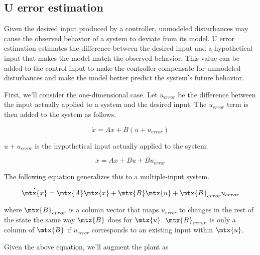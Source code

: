 \subsection{U error estimation}
\label{subsec:u_error_estimation}

Given the desired \gls{input} produced by a \gls{controller}, unmodeled
\glspl{disturbance} may cause the observed behavior of a \gls{system} to deviate
from its \gls{model}. U error estimation estimates the difference between the
desired \gls{input} and a hypothetical \gls{input} that makes the \gls{model}
match the observed behavior. This value can be added to the \gls{control input}
to make the \gls{controller} compensate for unmodeled \glspl{disturbance} and
make the \gls{model} better predict the \gls{system}'s future behavior.

First, we'll consider the one-dimensional case. Let $u_{error}$ be the
difference between the \gls{input} actually applied to a \gls{system} and the
desired \gls{input}. The $u_{error}$ term is then added to the \gls{system} as
follows.

\begin{equation*}
  \dot{x} = Ax + B\left(u + u_{error}\right)
\end{equation*}

$u + u_{error}$ is the hypothetical \gls{input} actually applied to the
\gls{system}.

\begin{equation*}
  \dot{x} = Ax + Bu + Bu_{error}
\end{equation*}

The following equation generalizes this to a multiple-input \gls{system}.

\begin{equation*}
  \dot{\mtx{x}} = \mtx{A}\mtx{x} + \mtx{B}\mtx{u} + \mtx{B}_{error}u_{error}
\end{equation*}

where $\mtx{B}_{error}$ is a column vector that maps $u_{error}$ to changes in
the rest of the \gls{state} the same way $\mtx{B}$ does for $\mtx{u}$.
$\mtx{B}_{error}$ is only a column of $\mtx{B}$ if $u_{error}$ corresponds to an
existing \gls{input} within $\mtx{u}$.

Given the above equation, we'll augment the \gls{plant} as

